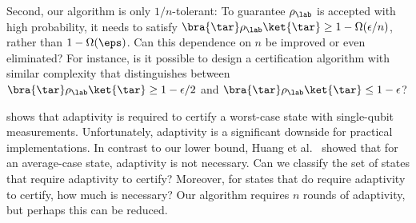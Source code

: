 Second, our algorithm is only $1/n$-tolerant: To guarantee $\rho_{\lab}$ is accepted with high probability, it needs to satisfy $\bra{\tar}\rho_{\lab}\ket{\tar} \geq 1 - \Omega(\epsilon/n)$, rather than $1-\Omega(\eps)$. Can this dependence on $n$ be improved or even eliminated? For instance, is it possible to design a certification algorithm with similar complexity that distinguishes between $\bra{\tar}\rho_{\lab}\ket{\tar} \geq 1 - \epsilon/2$ and $\bra{\tar}\rho_{\lab}\ket{\tar} \leq 1 - \epsilon$?

 shows that adaptivity is required to certify a worst-case state with single-qubit measurements. Unfortunately, adaptivity is a significant downside for practical implementations. In contrast to our lower bound, Huang et al.~\cite{huang2024certifying} showed that for an average-case state, adaptivity is not necessary. Can we classify the set of states that require adaptivity to certify? Moreover, for states that do require adaptivity to certify, how much is necessary? Our algorithm requires $n$ rounds of adaptivity, but perhaps this can be reduced.


%




